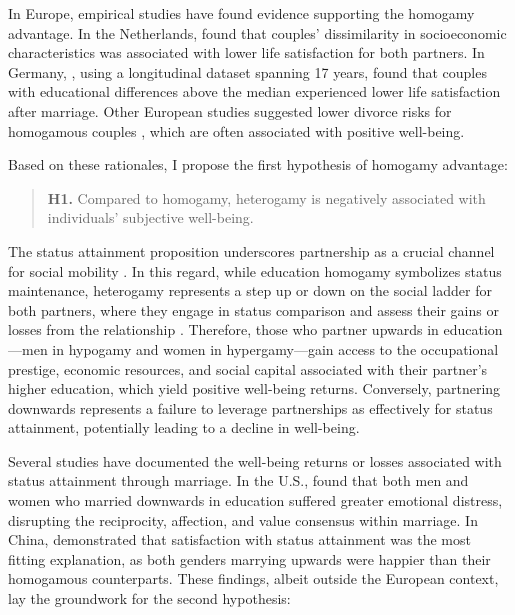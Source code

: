 In Europe, empirical studies have found evidence supporting the homogamy advantage. In the Netherlands, \textcite{keizerAreEqualsHappier2015} found that couples' dissimilarity in socioeconomic characteristics was associated with lower life satisfaction for both partners. In Germany, \textcite{stutzerDoesMarriageMake2006}, using a longitudinal dataset spanning 17 years, found that couples with educational differences above the median experienced lower life satisfaction after marriage. Other European studies suggested lower divorce risks for homogamous couples \parencite{beckerSelectionAlignmentTheir2010,kalmijnUnionDisruptionNetherlands2003}, which are often associated with positive well-being.

Based on these rationales, I propose the first hypothesis of homogamy advantage:

\begin{quote}
    \textbf{H1.} Compared to homogamy, heterogamy is negatively associated with individuals' subjective well-being.
\end{quote}

The status attainment proposition underscores partnership as a crucial channel for social mobility \parencite{taylorUtilityEducationAttractiveness1976}. In this regard, while education homogamy symbolizes status maintenance, heterogamy represents a step up or down on the social ladder for both partners, where they engage in status comparison and assess their gains or losses from the relationship \parencite{pearlinStatusInequalityStress1975,zhaoPartnersEducationalPairings2022}. Therefore, those who partner upwards in education—men in hypogamy and women in hypergamy—gain access to the occupational prestige, economic resources, and social capital associated with their partner's higher education, which yield positive well-being returns. Conversely, partnering downwards represents a failure to leverage partnerships as effectively for status attainment, potentially leading to a decline in well-being.

Several studies have documented the well-being returns or losses associated with status attainment through marriage. In the U.S., \textcite{pearlinStatusInequalityStress1975} found that both men and women who married downwards in education suffered greater emotional distress, disrupting the reciprocity, affection, and value consensus within marriage. In China, \textcite{zhaoPartnersEducationalPairings2022} demonstrated that satisfaction with status attainment was the most fitting explanation, as both genders marrying upwards were happier than their homogamous counterparts. These findings, albeit outside the European context, lay the groundwork for the second hypothesis:

